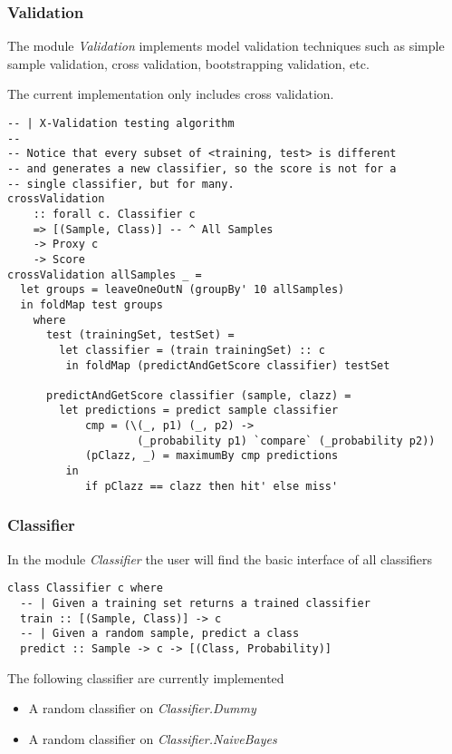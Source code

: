 \documentclass[12pt, a4paper]{article}
\begin{document}
\subsubsection{Validation} \label{validation}

The module \textit{Validation} implements model validation techniques such as simple sample validation, cross validation, bootstrapping validation, etc.

The current implementation only includes cross validation.

\begin{verbatim}
-- | X-Validation testing algorithm
--
-- Notice that every subset of <training, test> is different
-- and generates a new classifier, so the score is not for a
-- single classifier, but for many.
crossValidation
    :: forall c. Classifier c
    => [(Sample, Class)] -- ^ All Samples
    -> Proxy c
    -> Score
crossValidation allSamples _ =
  let groups = leaveOneOutN (groupBy' 10 allSamples)
  in foldMap test groups
    where
      test (trainingSet, testSet) =
        let classifier = (train trainingSet) :: c
         in foldMap (predictAndGetScore classifier) testSet

      predictAndGetScore classifier (sample, clazz) =
        let predictions = predict sample classifier
            cmp = (\(_, p1) (_, p2) ->
                    (_probability p1) `compare` (_probability p2))
            (pClazz, _) = maximumBy cmp predictions
         in
            if pClazz == clazz then hit' else miss'
\end{verbatim}

\subsubsection{Classifier} \label{classifier}

In the module \textit{Classifier} the user will find the basic interface of all classifiers

\begin{verbatim}
class Classifier c where
  -- | Given a training set returns a trained classifier
  train :: [(Sample, Class)] -> c
  -- | Given a random sample, predict a class
  predict :: Sample -> c -> [(Class, Probability)]
\end{verbatim}

The following classifier are currently implemented

\begin{itemize}
  \item A random classifier on \textit{Classifier.Dummy}
  \item A random classifier on \textit{Classifier.NaiveBayes}
\end{itemize}
\end{document}
